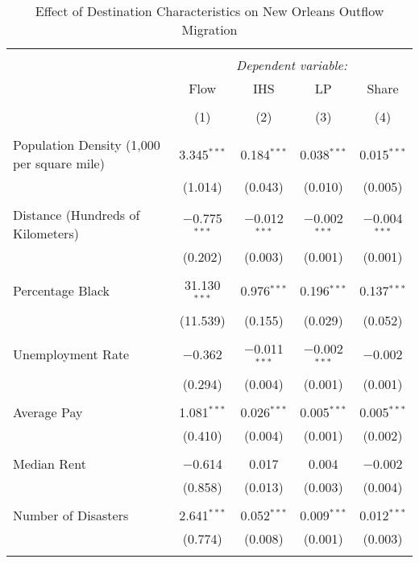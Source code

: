 \documentclass[]{article}
\begin{document}
\begin{table}[!htbp] \centering 
  \caption{\label{reg:regmainr}Effect of Destination Characteristics on New Orleans Outflow Migration} 
  \label{} 
\scriptsize 
\begin{tabular}{@{\extracolsep{5pt}}lcccc} 
\\[-1.8ex]\hline 
\hline \\[-1.8ex] 
 & \multicolumn{4}{c}{\textit{Dependent variable:}} \\ 
\cline{2-5} 
 & Flow & IHS & LP & Share \\ 
\\[-1.8ex] & (1) & (2) & (3) & (4)\\ 
\hline \\[-1.8ex] 
 Population Density (1,000 per square mile) & 3.345$^{***}$ & 0.184$^{***}$ & 0.038$^{***}$ & 0.015$^{***}$ \\ 
  & (1.014) & (0.043) & (0.010) & (0.005) \\ 
  & & & & \\ 
 Distance (Hundreds of Kilometers) & $-$0.775$^{***}$ & $-$0.012$^{***}$ & $-$0.002$^{***}$ & $-$0.004$^{***}$ \\ 
  & (0.202) & (0.003) & (0.001) & (0.001) \\ 
  & & & & \\ 
 Percentage Black & 31.130$^{***}$ & 0.976$^{***}$ & 0.196$^{***}$ & 0.137$^{***}$ \\ 
  & (11.539) & (0.155) & (0.029) & (0.052) \\ 
  & & & & \\ 
 Unemployment Rate & $-$0.362 & $-$0.011$^{***}$ & $-$0.002$^{***}$ & $-$0.002 \\ 
  & (0.294) & (0.004) & (0.001) & (0.001) \\ 
  & & & & \\ 
 Average Pay & 1.081$^{***}$ & 0.026$^{***}$ & 0.005$^{***}$ & 0.005$^{***}$ \\ 
  & (0.410) & (0.004) & (0.001) & (0.002) \\ 
  & & & & \\ 
 Median Rent & $-$0.614 & 0.017 & 0.004 & $-$0.002 \\ 
  & (0.858) & (0.013) & (0.003) & (0.004) \\ 
  & & & & \\ 
 Number of Disasters & 2.641$^{***}$ & 0.052$^{***}$ & 0.009$^{***}$ & 0.012$^{***}$ \\ 
  & (0.774) & (0.008) & (0.001) & (0.003) \\ 
  & & & & \\ 

\end{tabular}
\end{table}
\end{document}
